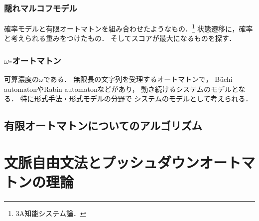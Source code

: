 \documentclass[uplatex, dvipdfmx]{jsreport}
\begin{document}
\subsection{隠れマルコフモデル}

確率モデルと有限オートマトンを組み合わせたようなもの．\footnote{3A知能システム論．}
状態遷移に，確率と考えられる重みをつけたもの．
そしてスコアが最大になるものを探す．

\subsection{$\omega$-オートマトン}

可算濃度の$\omega$である．
無限長の文字列を受理するオートマトンで，
Büchi automatonやRabin automatonなどがあり，
動き続けるシステムのモデルとなる．
特に形式手法・形式モデルの分野で
システムのモデルとして考えられる．

\section{有限オートマトンについてのアルゴリズム}

\begin{tcolorbox}[colframe=ForestGreen, colback=ForestGreen!10!white, breakable]
    
\end{tcolorbox}

\chapter{文脈自由文法とプッシュダウンオートマトンの理論}
\end{document}
